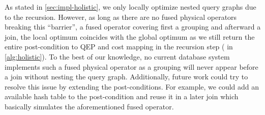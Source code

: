 
As stated in \autoref{sec:impl-holistic}, we only locally optimize nested query graphs due to the recursion.  However, as long as there are no fused physical operators breaking this ``barrier'', \eg a fused operator covering first a grouping and afterward a join, the local optimum coincides with the global optimum as we still return the entire post-condition to QEP and cost mapping in the recursion step ( in \autoref{alg:holistic}).  To the best of our knowledge, no current database system implements such a fused physical operator as a grouping will never appear before a join without nesting the query graph.  Additionally, future work could try to resolve this issue by extending the post-conditions.  For example, we could add an available hash table to the post-condition and reuse it in a later join which basically simulates the aforementioned fused operator.

